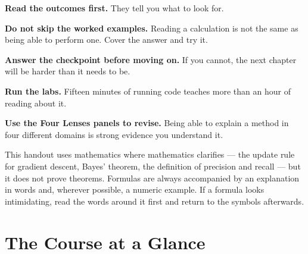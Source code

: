 \begin{tightnum}
  \item \textbf{Read the outcomes first.} They tell you what to look for.
  \item \textbf{Do not skip the worked examples.} Reading a calculation is not
        the same as being able to perform one. Cover the answer and try it.
  \item \textbf{Answer the checkpoint before moving on.} If you cannot, the
        next chapter will be harder than it needs to be.
  \item \textbf{Run the labs.} Fifteen minutes of running code teaches more
        than an hour of reading about it.
  \item \textbf{Use the Four Lenses panels to revise.} Being able to explain a
        method in four different domains is strong evidence you understand it.
\end{tightnum}

\begin{alertbox}
This handout uses mathematics where mathematics clarifies --- the update rule
for gradient descent, Bayes' theorem, the definition of precision and recall ---
but it does not prove theorems. Formulas are always accompanied by an
explanation in words and, wherever possible, a numeric example. If a formula
looks intimidating, read the words around it first and return to the symbols
afterwards.
\end{alertbox}

\newpage

\chapter*{The Course at a Glance}

